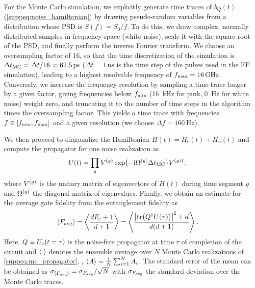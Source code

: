 For the Monte Carlo simulation, we explicitly generate time traces of $b_Q(t)$ (\cf \cref{suppeq:noise_hamiltonian}) by drawing pseudo-random variables from a distribution whose PSD is $S(f) = S_0/f$. To do this, we draw complex, normally distributed samples in frequency space (\ie white noise), scale it with the square root of the PSD, and finally perform the inverse Fourier transform. We choose an oversampling factor of 16, so that the time discretization of the simulation is $\Delta t_\mr{MC} = \flatfrac{\Delta t}{16} = \SI{62.5}{\pico\second}$ ($\Delta t = \SI{1}{\nano\second}$ is the time step of the pulses used in the FF simulation), leading to a highest resolvable frequency of $f_{\mathrm{max}} = \SI{16}{\giga\hertz}$. Conversely, we increase the frequency resolution by sampling a time trace longer by a given factor, giving frequencies below $f_{\mathrm{min}}$ (\SI{16}{\kilo\hertz} for pink, \SI{0}{\hertz} for white noise) weight zero, and truncating it to the number of time steps in the algorithm times the oversampling factor. This yields a time trace with frequencies $f\in [f_{\mathrm{min}}, f_{\mathrm{max}}]$ and a given resolution (we choose $\Delta f = \SI{160}{\hertz}$). 

We then proceed to diagonalize the Hamiltonian $H(t) = H_c(t) + H_n(t)$ and compute the propagator for one noise realization as
\begin{equation}\label{suppeq:mc_propagator}
    U(t) = \prod_g V^{(g)}\exp\lbrace -\mathrm{i}\Omega^{(g)}\Delta t_{\mathrm{MC}}\rbrace V^{(g)\dagger},
\end{equation}
where $V^{(g)}$ is the unitary matrix of eigenvectors of $H(t)$ during time segment $g$ and $\Omega^{(g)}$ the diagonal matrix of eigenvalues. Finally, we obtain an estimate for the average gate fidelity \avgfid from the entanglement fidelity \entfid as
\begin{equation}
    \ev{\avgfid} = \ev{\frac{d\entfid + 1}{d+1}} = \ev{\frac{\abs{\tr(Q\adjoint U(\tau))}^2 + d}{d(d+1)}}.
\end{equation}
Here, $Q\equiv U_{\mathrm{c}}(t=\tau)$ is the noise-free propagator at time $\tau$ of completion of the circuit and $\ev{\cdot}$ denotes the ensemble average over $N$ Monte Carlo realizations of \cref{suppeq:mc_propagator}, \ie, $\ev{A}=\frac{1}{N}\sum_{i=1}^N A_i$. The standard error of the mean can be obtained as $\sigma_{\ev{\avgfid}} = \sigma_{\avgfid} / \sqrt{N}$ with $\sigma_{F_{\mathrm{avg}}}$ the standard deviation over the Monte Carlo traces.

